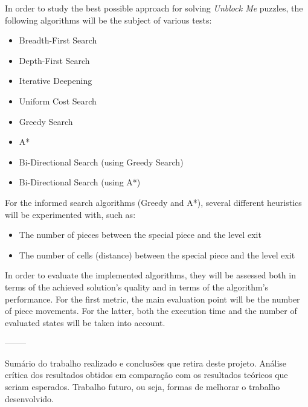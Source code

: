\documentclass[conference]{IEEEtran}
\begin{document}
In order to study the best possible approach for solving \textit{Unblock Me} puzzles, the following algorithms will be the subject of various tests:
\begin{itemize}
    \item Breadth-First Search
    \item Depth-First Search
    \item Iterative Deepening
    \item Uniform Cost Search
    \item Greedy Search
    \item A*
    \item Bi-Directional Search (using Greedy Search)
    \item Bi-Directional Search (using A*)
\end{itemize}

For the informed search algorithms (Greedy and A*), several different heuristics will be experimented with, such as:

\begin{itemize}
    \item The number of pieces between the special piece and the level exit
    \item The number of cells (distance) between the special piece and the level exit
\end{itemize}

In order to evaluate the implemented algorithms, they will be assessed both in terms of the achieved solution's quality and in terms of the algorithm's performance. For the first metric, the main evaluation point will be the number of piece movements. For the latter, both the execution time and the number of evaluated states will be taken into account.

--------

Sumário do trabalho realizado e conclusões que retira deste projeto. Análise crítica dos resultados obtidos em comparação com os resultados teóricos que seriam esperados. Trabalho futuro, ou seja, formas de melhorar o trabalho desenvolvido.
\end{document}
